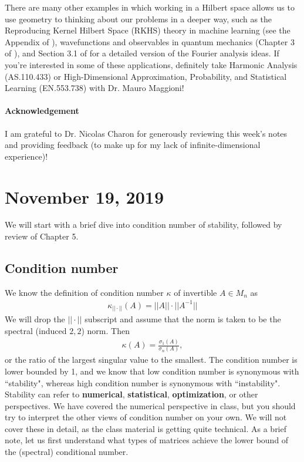 \documentclass[11pt]{article}
\theoremstyle{plain}
\theoremstyle{definition}
\theoremstyle{remark}
\begin{document}
There are many other examples in which working in a Hilbert space allows us to use geometry to thinking about our problems in a deeper way, such as the Reproducing Kernel Hilbert Space (RKHS) theory in machine learning (see the Appendix of \citet{nonpar}), wavefunctions and observables in quantum mechanics (Chapter 3 of \citet{griffiths}), and Section 3.1 of \citet{fourier} for a detailed version of the Fourier analysis ideas. If you're interested in some of these applications, definitely take Harmonic Analysis (AS.110.433) or High-Dimensional Approximation, Probability, and Statistical Learning (EN.553.738) with Dr. Mauro Maggioni!

\paragraph{Acknowledgement} I am grateful to Dr. Nicolas Charon for generously reviewing this week's notes and providing feedback (to make up for my lack of infinite-dimensional experience)!

\section{November 19, 2019}

We will start with a brief dive into condition number of stability, followed by review of Chapter 5.

\subsection*{Condition number}

We know the definition of condition number $\kappa$ of invertible $A \in M_n$ as
\begin{align*}
    \kappa_{||\cdot||}(A) = ||A||\cdot||A^{-1}||
\end{align*}
We will drop the $||\cdot||$ subscript and assume that the norm is taken to be the spectral (induced $2,2$) norm. Then
\begin{align*}
    \kappa(A) = \frac{\sigma_1(A)}{\sigma_n(A)},
\end{align*}
or the ratio of the largest singular value to the smallest. The condition number is lower bounded by 1, and we know that low condition number is synonymous with ``stability", whereas high condition number is synonymous with ``instability". Stability can refer to {\bf numerical}, {\bf statistical}, {\bf optimization}, or other perspectives. We have covered the numerical perspective in class, but you should try to interpret the other views of condition number on your own. We will not cover these in detail, as the class material is getting quite technical. As a brief note, let us first understand what types of matrices achieve the lower bound of the (spectral) conditional number.
\end{document}

